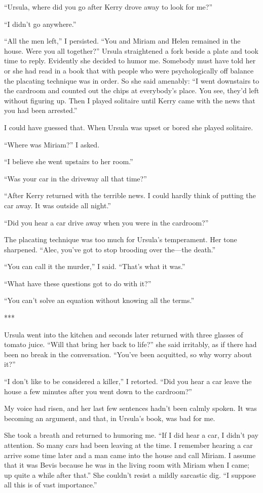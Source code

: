 \documentclass{novel}
\begin{document}
“Ursula, where did you go after Kerry drove away to look for me?”

“I didn’t go anywhere.”

“All the men left,” I persisted. “You and Miriam and Helen remained in the house. Were you all together?” Ursula straightened a fork beside a plate and took time to reply. Evidently she decided to humor me. Somebody must have told her or she had read in a book that with people who were psychologically off balance the placating technique was in order. So she said amenably: “I went downstairs to the cardroom and counted out the chips at everybody’s place. You see, they’d left without figuring up. Then I played solitaire until Kerry came with the news that you had been arrested.”

I could have guessed that. When Ursula was upset or bored she played solitaire.

“Where was Miriam?” I asked.

“I believe she went upstairs to her room.”

“Was your car in the driveway all that time?”

“After Kerry returned with the terrible news. I could hardly think of putting the car away. It was outside all night.”

“Did you hear a car drive away when you were in the cardroom?”

The placating technique was too much for Ursula’s temperament. Her tone sharpened. “Alec, you’ve got to stop brooding over the—the death.”

“You can call it the murder,” I said. “That’s what it was.”

“What have these questions got to do with it?”

“You can’t solve an equation without knowing all the terms.”

***

Ursula went into the kitchen and seconds later returned with three glasses of tomato juice. “Will that bring her back to life?” she said irritably, as if there had been no break in the conversation. “You’ve been acquitted, so why worry about it?”

“I don’t like to be considered a killer,” I retorted. “Did you hear a car leave the house a few minutes after you went down to the cardroom?”

My voice had risen, and her last few sentences hadn’t been calmly spoken. It was becoming an argument, and that, in Ursula’s book, was bad for me.

She took a breath and returned to humoring me. “If I did hear a car, I didn’t pay attention. So many cars had been leaving at the time. I remember hearing a car arrive some time later and a man came into the house and call Miriam. I assume that it was Bevis because he was in the living room with Miriam when I came; up quite a while after that.” She couldn’t resist a mildly sarcastic dig. “I suppose all this is of vast importance.”
\end{document}
